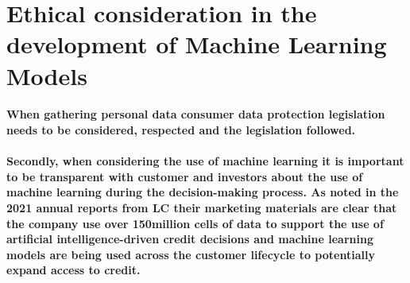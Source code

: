 \documentclass[
]{article}
\begin{document}
\hypertarget{ethical-consideration-in-the-development-of-machine-learning-models}{%
\section{Ethical consideration in the development of Machine Learning
Models}\label{ethical-consideration-in-the-development-of-machine-learning-models}}

\hypertarget{when-gathering-personal-data-consumer-data-protection-legislation-needs-to-be-considered-respected-and-the-legislation-followed.}{%
\paragraph{When gathering personal data consumer data protection
legislation needs to be considered, respected and the legislation
followed.}\label{when-gathering-personal-data-consumer-data-protection-legislation-needs-to-be-considered-respected-and-the-legislation-followed.}}

\hypertarget{secondly-when-considering-the-use-of-machine-learning-it-is-important-to-be-transparent-with-customer-and-investors-about-the-use-of-machine-learning-during-the-decision-making-process.-as-noted-in-the-2021-annual-reports-from-lc-their-marketing-materials-are-clear-that-the-company-use-over-150million-cells-of-data-to-support-the-use-of-artificial-intelligence-driven-credit-decisions-and-machine-learning-models-are-being-used-across-the-customer-lifecycle-to-potentially-expand-access-to-credit.}{%
\paragraph{Secondly, when considering the use of machine learning it is
important to be transparent with customer and investors about the use of
machine learning during the decision-making process. As noted in the
2021 annual reports from LC their marketing materials are clear that the
company use over 150million cells of data to support the use of
artificial intelligence-driven credit decisions and machine learning
models are being used across the customer lifecycle to potentially
expand access to
credit.}\label{secondly-when-considering-the-use-of-machine-learning-it-is-important-to-be-transparent-with-customer-and-investors-about-the-use-of-machine-learning-during-the-decision-making-process.-as-noted-in-the-2021-annual-reports-from-lc-their-marketing-materials-are-clear-that-the-company-use-over-150million-cells-of-data-to-support-the-use-of-artificial-intelligence-driven-credit-decisions-and-machine-learning-models-are-being-used-across-the-customer-lifecycle-to-potentially-expand-access-to-credit.}}
\end{document}
